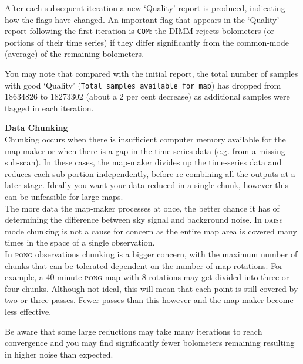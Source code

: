 \documentclass[twoside,11pt]{article}
\newenvironment{latexonly}{}{}
\renewcommand{\_}{\texttt{\symbol{95}}}
\newenvironment{fmpage}[1]{\begin{lrbox}{\fmbox}\begin{minipage}{#1}}{\end{minipage}\end{lrbox}\fbox{\usebox{\fmbox}}}
\begin{document}
After each subsequent iteration a new `Quality' report is produced,
indicating how the flags have changed. An important flag that appears
in the `Quality' report following the first iteration is \texttt{COM}:
the DIMM rejects bolometers (or portions of their time series) if they
differ significantly from the common-mode (average) of the remaining
bolometers.

You may note that compared with the initial report, the total number of samples
with good `Quality' (\texttt{Total samples available for map}) has
dropped from 18634826 to 18273302 (about a 2 per cent decrease) as
additional samples were flagged in each iteration.
\begin{latexonly}
\begin{center}
\begin{fmpage}{0.92\linewidth}
\label{page:text}
\begin{minipage}[t]{0.025\linewidth}
\hspace{0.1cm}
\end{minipage}
\begin{minipage}[t]{0.93\linewidth}
\vspace{0.2cm}
\textbf{Data Chunking}\\
Chunking occurs when there is insufficient computer memory available
for the map-maker or when there is a gap in the time-series data (e.g.
from a missing sub-scan). In these cases, the map-maker divides up the
time-series data and reduces each sub-portion independently, before
re-combining all the outputs at a later stage. Ideally you want your
data reduced in a single chunk, however this can be unfeasible for
large maps.
\vspace{0.2cm}\\
The more data the map-maker processes at once, the better chance it
has of determining the difference between sky signal and background
noise. In \textsc{daisy} mode chunking is not a cause for concern as
the entire map area is covered many times in the space of a single
observation.
\vspace{0.2cm}\\
In \textsc{pong} observations chunking is a bigger concern, with the
maximum number of chunks that can be tolerated dependent on the number
of map rotations. For example, a 40-minute \textsc{pong} map with 8
rotations may get divided into three or four chunks. Although not
ideal, this will mean that each point is still covered by two or three
passes. Fewer passes than this however and the map-maker become less
effective.
\vspace{0.2cm}
\end{minipage}
\begin{minipage}[t]{0.025\linewidth}
\hspace{0.1cm}
\end{minipage}
\end{fmpage}
\end{center}
Be aware that some large reductions may take many iterations to reach
convergence and you may find significantly fewer bolometers remaining
resulting in higher noise than expected.
\end{latexonly}
\end{document}
